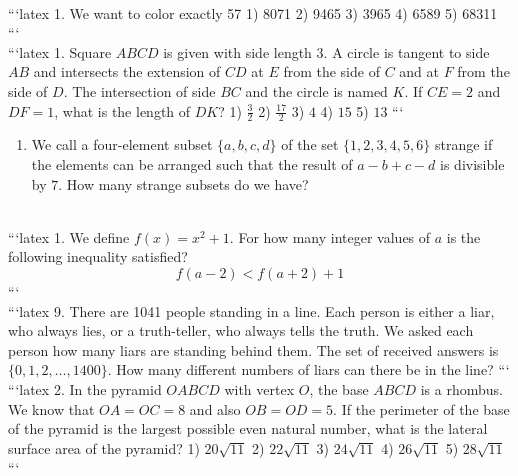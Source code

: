 \\
```latex
1. We want to color exactly 57%
1) 8071  2) 9465  3) 3965  4) 6589  5) 68311
```
\\
```latex
1. Square $ABCD$ is given with side length $3$. A circle is tangent to side $AB$ and intersects the extension of $CD$ at $E$ from the side of $C$ and at $F$ from the side of $D$. The intersection of side $BC$ and the circle is named $K$. If $CE = 2$ and $DF = 1$, what is the length of $DK$? 
1) $\frac{3}{2}$  2) $\frac{17}{2}$  3) $4$  4) $15$  5) $13$
```
\\
\begin{enumerate}
    \item We call a four-element subset $\{a, b, c, d\}$ of the set $\{1, 2, 3, 4, 5, 6\}$ strange if the elements can be arranged such that the result of $a - b + c - d$ is divisible by $7$. How many strange subsets do we have?
\end{enumerate}
\\
```latex
1. We define \( f(x) = x^2 + 1 \). For how many integer values of \( a \) is the following inequality satisfied? 
\[ f(a-2) < f(a+2) + 1 \]
```
\\
```latex
9. There are 1041 people standing in a line. Each person is either a liar, who always lies, or a truth-teller, who always tells the truth. We asked each person how many liars are standing behind them. The set of received answers is $\{0, 1, 2, \ldots, 1400\}$. How many different numbers of liars can there be in the line?
```
\\
```latex
2. In the pyramid $OABCD$ with vertex $O$, the base $ABCD$ is a rhombus. We know that $OA = OC = 8$ and also $OB = OD = 5$. If the perimeter of the base of the pyramid is the largest possible even natural number, what is the lateral surface area of the pyramid? 
1) $20 \sqrt{11}$  2) $22 \sqrt{11}$  3) $24 \sqrt{11}$  4) $26 \sqrt{11}$  5) $28 \sqrt{11}$
```

